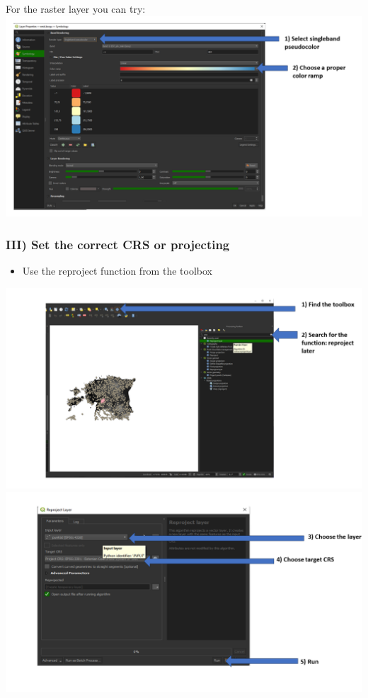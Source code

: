 \documentclass[
  letterpaper,
  DIV=11,
  numbers=noendperiod]{scrartcl}
\providecommand{\tightlist}{%
  \setlength{\itemsep}{0pt}\setlength{\parskip}{0pt}}\usepackage{longtable,booktabs,array}
\begin{document}
For the raster layer you can try:
\includegraphics{Lab1/qgis_ss/QGIS_ss13.png}

\hypertarget{iii-set-the-correct-crs-or-projecting}{%
\subsubsection{III) Set the correct CRS or
projecting}\label{iii-set-the-correct-crs-or-projecting}}

\begin{itemize}
\tightlist
\item
  Use the reproject function from the toolbox
\end{itemize}

\includegraphics{Lab1/qgis_ss/QGIS_ss8.png}
\includegraphics{Lab1/qgis_ss/QGIS_ss9.png}
\end{document}
